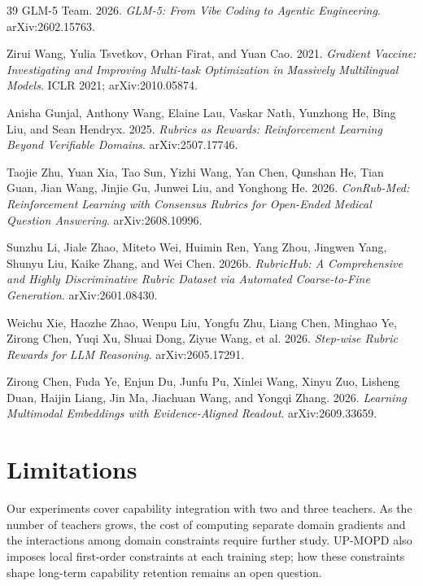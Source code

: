 \documentclass{article}
\begin{document}
\begin{thebibliography}{39}
 GLM-5 Team. 2026. \emph{GLM-5: From Vibe Coding to Agentic Engineering}. arXiv:2602.15763.

 Zirui Wang, Yulia Tsvetkov, Orhan Firat, and Yuan Cao. 2021. \emph{Gradient Vaccine: Investigating and Improving Multi-task Optimization in Massively Multilingual Models}. ICLR 2021; arXiv:2010.05874.

 Anisha Gunjal, Anthony Wang, Elaine Lau, Vaskar Nath, Yunzhong He, Bing Liu, and Sean Hendryx. 2025. \emph{Rubrics as Rewards: Reinforcement Learning Beyond Verifiable Domains}. arXiv:2507.17746.

 Taojie Zhu, Yuan Xia, Tao Sun, Yizhi Wang, Yan Chen, Qunshan He, Tian Guan, Jian Wang, Jinjie Gu, Junwei Liu, and Yonghong He. 2026. \emph{ConRub-Med: Reinforcement Learning with Consensus Rubrics for Open-Ended Medical Question Answering}. arXiv:2608.10996.

 Sunzhu Li, Jiale Zhao, Miteto Wei, Huimin Ren, Yang Zhou, Jingwen Yang, Shunyu Liu, Kaike Zhang, and Wei Chen. 2026b. \emph{RubricHub: A Comprehensive and Highly Discriminative Rubric Dataset via Automated Coarse-to-Fine Generation}. arXiv:2601.08430.

 Weichu Xie, Haozhe Zhao, Wenpu Liu, Yongfu Zhu, Liang Chen, Minghao Ye, Zirong Chen, Yuqi Xu, Shuai Dong, Ziyue Wang, et al. 2026. \emph{Step-wise Rubric Rewards for LLM Reasoning}. arXiv:2605.17291.




 Zirong Chen, Fuda Ye, Enjun Du, Junfu Pu, Xinlei Wang, Xinyu Zuo, Lisheng Duan, Haijin Liang, Jin Ma, Jiachuan Wang, and Yongqi Zhang. 2026. \emph{Learning Multimodal Embeddings with Evidence-Aligned Readout}. arXiv:2609.33659.

\end{thebibliography}
\clearpage
\appendix
\section{Limitations}

Our experiments cover capability integration with two and three
teachers. As the number of teachers grows, the cost of computing
separate domain gradients and the interactions among domain
constraints require further study. UP-MOPD also imposes local
first-order constraints at each training step; how these constraints
shape long-term capability retention remains an open question.
\end{document}
